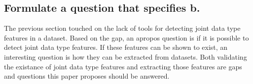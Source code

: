 \subsection{Formulate a question that specifies b.}

The previous section touched on the lack of tools for detecting joint data type features in a dataset.  Based on the gap, an apropos question is if it is possible to detect joint data type features.  If these features can be shown to exist, an interesting question is how they can be extracted from datasets.  Both validating the existance of joint data type features and extracting those features are gaps and questions this paper proposes should be answered.




